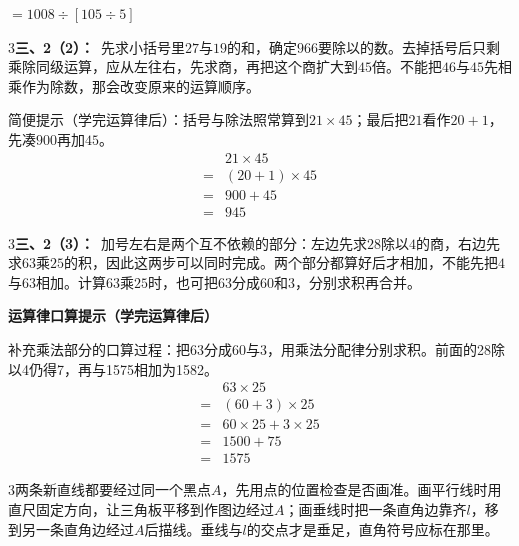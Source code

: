 \documentclass[multi=snippet,border={5bp 20bp 5bp 5bp}]{standalone}
\newenvironment{snippet}[3]{\begin{minipage}{#1bp}\color{answerred}\fontsize{#2}{#3}\selectfont\raggedright}{\end{minipage}}
\begin{document}
\begin{snippet}{92.05979309082032}{10}{12.8}\SourceSans\setlength{\mathindent}{2bp}\(\displaystyle=1008\div[105\div5]\)\end{snippet}
\begin{snippet}{505}{11.5}{14}\begin{multicols}{3}\raggedcolumns \textbf{三、2（2）：}\ 先求小括号里\(27\)\allowbreak 与\(19\)\allowbreak 的和，确定\(966\)\allowbreak 要除以的数。去掉括号后只剩乘除同级运算，应从左往右，先求商，再把这个商扩大到\(45\)\allowbreak 倍。不能把\(46\)\allowbreak 与\(45\)\allowbreak 先相乘作为除数，那会改变原来的运算顺序。\par 简便提示（学完运算律后）：括号与除法照常算到\(21\times45\)\allowbreak ；最后把\(21\)\allowbreak 看作\(20+1\)\allowbreak ，先凑\(900\)\allowbreak 再加\(45\)\allowbreak 。\[\begin{aligned}&21\times45\\={}&(20+1)\times45\\={}&900+45\\={}&945\end{aligned}\]\end{multicols}\end{snippet}
\begin{snippet}{505}{11.5}{14}\begin{multicols}{3}\raggedcolumns \textbf{三、2（3）：}\ 加号左右是两个互不依赖的部分：左边先求\(28\)\allowbreak 除以\(4\)\allowbreak 的商，右边先求\(63\)\allowbreak 乘\(25\)\allowbreak 的积，因此这两步可以同时完成。两个部分都算好后才相加，不能先把\(4\)\allowbreak 与\(63\)\allowbreak 相加。计算\(63\)\allowbreak 乘\(25\)\allowbreak 时，也可把\(63\)\allowbreak 分成\(60\)\allowbreak 和\(3\)\allowbreak ，分别求积再合并。\par\textbf{运算律口算提示（学完运算律后）}\par 补充乘法部分的口算过程：把63分成60与3，用乘法分配律分别求积。前面的28除以4仍得7，再与1575相加为1582。\[\begin{aligned}&63\times25\\={}&(60+3)\times25\\={}&60\times25+3\times25\\={}&1500+75\\={}&1575\end{aligned}\]\end{multicols}\end{snippet}
\begin{snippet}{505}{11.5}{14}\begin{multicols}{3}\raggedcolumns 两条新直线都要经过同一个黑点\(A\)\allowbreak ，先用点的位置检查是否画准。画平行线时用直尺固定方向，让三角板平移到作图边经过\(A\)\allowbreak ；画垂线时把一条直角边靠齐\(l\)\allowbreak ，移到另一条直角边经过\(A\)\allowbreak 后描线。垂线与\(l\)\allowbreak 的交点才是垂足，直角符号应标在那里。\end{multicols}\end{snippet}
\end{document}
